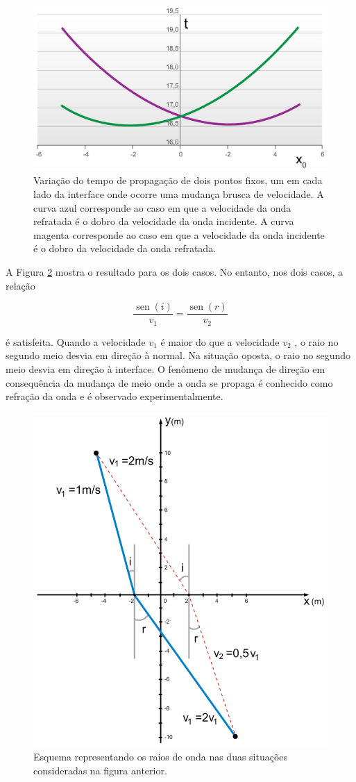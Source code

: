 \documentclass[]{book}
\theoremstyle{definition}
\theoremstyle{definition}
\theoremstyle{definition}
\theoremstyle{remark}
\begin{document}
\begin{figure}

{\centering \includegraphics[width=0.5\linewidth]{fig/figU04} 

}

\caption{Variação do tempo de propagação de dois pontos fixos, um em cada lado da interface onde ocorre uma mudança brusca de velocidade. A curva azul corresponde ao caso em que a velocidade da onda refratada é o dobro da velocidade da onda incidente. A curva magenta corresponde ao caso em que a velocidade da onda incidente é o dobro da velocidade da onda refratada.}\label{fig:usp0404}
\end{figure}

A Figura \ref{fig:usp0405} mostra o resultado para os dois casos. No entanto, nos dois casos, a relação

\begin{equation}
\frac{\operatorname{sen}(i)}{v_{1}}=\frac{\operatorname{sen}(r)}{v_{2}}  \label{eq:0333}
\end{equation}

é satisfeita. Quando a velocidade \(v_1\) é maior do que a velocidade \(v_2\) , o raio no segundo meio desvia em direção à normal. Na situação oposta, o raio no segundo meio desvia em direção à interface. O fenômeno de mudança de direção em consequência da mudança de meio onde a onda se propaga é conhecido como refração da onda e é observado experimentalmente.

\begin{figure}

{\centering \includegraphics[width=0.5\linewidth]{fig/figU05} 

}

\caption{Esquema representando os raios de onda nas duas situações consideradas na figura anterior.}\label{fig:usp0405}
\end{figure}
\end{document}
